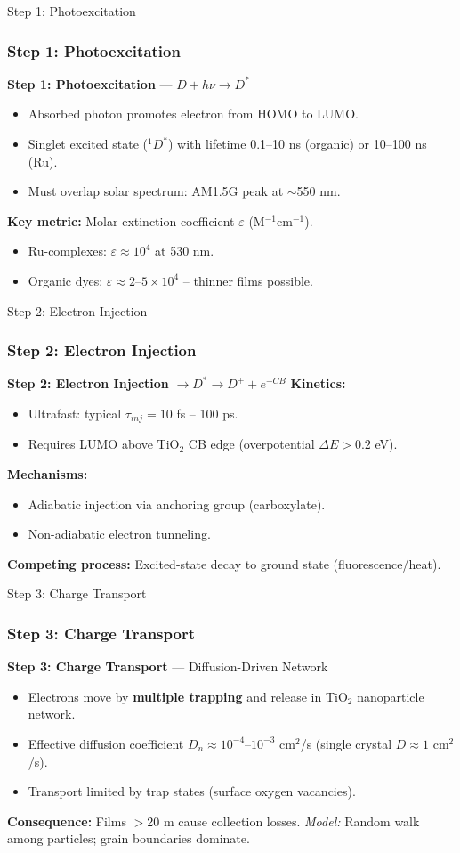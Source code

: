 \documentclass[aspectratio=169]{beamer}
\begin{document}
\begin{frame}{Step 1: Photoexcitation}
\frametitle{Step 1: Photoexcitation}

\textbf{Step 1: Photoexcitation} — $D + h\nu \rightarrow D^*$
\begin{itemize}
\item Absorbed photon promotes electron from HOMO to LUMO.
\item Singlet excited state ($^1D^*$) with lifetime 0.1–10 ns (organic) or 10–100 ns (Ru).
\item Must overlap solar spectrum: AM1.5G peak at $\sim$550 nm.
\end{itemize}
\textbf{Key metric:} Molar extinction coefficient $\varepsilon$ (M$^{-1}$cm$^{-1}$).
\begin{itemize}
\item Ru-complexes: $\varepsilon \approx 10^4$ at 530 nm.
\item Organic dyes: $\varepsilon \approx 2–5 \times 10^4$ – thinner films possible.
\end{itemize}
\cite{Ardo2009}
\end{frame}


\begin{frame}{Step 2: Electron Injection}
\frametitle{Step 2: Electron Injection}

\textbf{Step 2: Electron Injection} $\rightarrow D^* \rightarrow D^+ + e^{-CB}$
\textbf{Kinetics:}
\begin{itemize}
\item Ultrafast: typical $\tau_{inj} = 10$ fs – 100 ps.
\item Requires LUMO above TiO$_2$ CB edge (overpotential $\Delta E > 0.2$ eV).
\end{itemize}
\textbf{Mechanisms:}
\begin{itemize}
\item Adiabatic injection via anchoring group (carboxylate).
\item Non-adiabatic electron tunneling.
\end{itemize}
\textbf{Competing process:} Excited-state decay to ground state (fluorescence/heat).
\cite{Koops2009}
\end{frame}


\begin{frame}{Step 3: Charge Transport}
\frametitle{Step 3: Charge Transport}

\textbf{Step 3: Charge Transport} — Diffusion-Driven Network
\begin{itemize}
\item Electrons move by \textbf{multiple trapping} and release in TiO$_2$ nanoparticle network.
\item Effective diffusion coefficient $D_n \approx 10^{-4} – 10^{-3}$ cm$^2$/s (single crystal $D \approx 1$ cm$^2$/s).
\item Transport limited by trap states (surface oxygen vacancies).
\end{itemize}
\textbf{Consequence:} Films $>$20 \textmu m cause collection losses.
\vspace{2mm}
\emph{Model:} Random walk among particles; grain boundaries dominate.
\cite{Nelson2003}
\end{frame}
\end{document}
